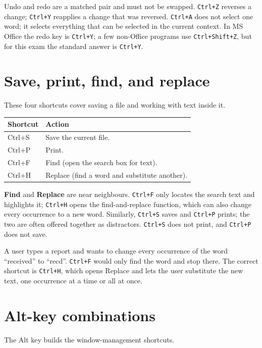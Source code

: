 Undo and redo are a matched pair and must not be swapped. \texttt{Ctrl+Z}
reverses a change; \texttt{Ctrl+Y} reapplies a change that was reversed.
\texttt{Ctrl+A} does not select one word; it selects everything that can be
selected in the current context. In MS Office the redo key is \texttt{Ctrl+Y};
a few non-Office programs use \texttt{Ctrl+Shift+Z}, but for this exam the
standard answer is \texttt{Ctrl+Y}.

\section{Save, print, find, and replace}
These four shortcuts cover saving a file and working with text inside it.

\begin{center}
\begin{tabular}{p{}p{}}
\toprule
\textbf{Shortcut} & \textbf{Action} \\
\midrule
Ctrl+S & Save the current file. \\
Ctrl+P & Print. \\
Ctrl+F & Find (open the search box for text). \\
Ctrl+H & Replace (find a word and substitute another). \\
\bottomrule
\end{tabular}
\end{center}

\textbf{Find} and \textbf{Replace} are near neighbours. \texttt{Ctrl+F} only
locates the search text and highlights it; \texttt{Ctrl+H} opens the
find-and-replace function, which can also change every occurrence to a new
word. Similarly, \texttt{Ctrl+S} saves and \texttt{Ctrl+P} prints; the two are
often offered together as distractors. \texttt{Ctrl+S} does not print, and
\texttt{Ctrl+P} does not save.

\begin{example}
A user types a report and wants to change every occurrence of the word
``received'' to ``recd''. \texttt{Ctrl+F} would only find the word and stop
there. The correct shortcut is \texttt{Ctrl+H}, which opens Replace and lets
the user substitute the new text, one occurrence at a time or all at once.
\end{example}

\section{Alt-key combinations}
The Alt key builds the window-management shortcuts.

